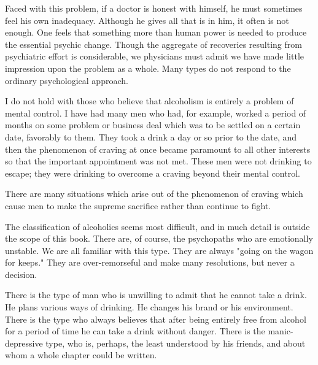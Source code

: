 {\begin{biblechapter}
\verse Faced with this problem, 
    if a doctor is honest with himself, 
    he must sometimes feel his own inadequacy. 
\verse Although he gives all that is in him, it often is not enough. 
\verse One feels that something more than human power is needed to produce the essential psychic change. 
\verse Though the aggregate of recoveries resulting from psychiatric effort is considerable, 
    we physicians must admit we have made little impression upon the problem as a whole. 
\verse Many types do not respond to the ordinary psychological approach.
\end{biblechapter}


\begin{biblechapter}
    I do not hold with those who believe that alcoholism is entirely a problem of mental control. 
\verse I have had many men who had, for example, 
    worked a period of months on some problem or business deal which was to be settled on a certain date, 
    favorably to them. 
\verse They took a drink a day or so prior to the date, 
    and then the phenomenon of craving at once became paramount to all other interests 
    so that the important appointment was not met. 
\verse These men were not drinking to escape; 
    they were drinking to overcome a craving beyond their mental control.

\verse There are many situations which arise out of the phenomenon of craving 
    which cause men to make the supreme sacrifice rather than continue to fight.
\end{biblechapter}


\begin{biblechapter}
    The classification of alcoholics seems most difficult, 
    and in much detail is outside the scope of this book. 
\verse There are, of course, the psychopaths who are emotionally unstable. 
\verse We are all familiar with this type. 
\verse They are always "going on the wagon for keeps." 
\verse They are over-remorseful and make many resolutions, but never a decision.

\verse There is the type of man who is unwilling to admit that he cannot take a drink. 
\verse He plans various ways of drinking. 
\verse He changes his brand or his environment. 
\verse There is the type who always believes that 
    after being entirely free from alcohol for a period of time 
    he can take a drink without danger. 
\verse There is the manic-depressive type, who is, perhaps, 
    the least understood by his friends, 
    and about whom a whole chapter could be written.


\end{biblechapter}}
